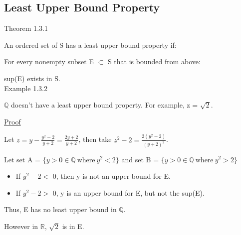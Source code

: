 \subsection{Least Upper Bound Property}

{ \color{red} Theorem 1.3.1 }

\qquad An ordered set of S has a least upper bound property if:

\qquad \qquad For every nonempty subset E $ \subset $ S that is bounded from above:

\qquad \qquad \qquad sup(E) exists in S. \\

{ \color{purple} Example 1.3.2 }

\qquad $ \mathbb{Q} $ doesn't have a least upper bound property. For example, z = $ \sqrt{2} $.

{\color{magenta} \underline{Proof}}

Let $ z = y - \frac{y^2-2}{y+2} = \frac{2y+2}{y+2} $, then take $ z^2-2 = \frac{2(y^2-2)}{(y+2)^2} $.

Let set A = $ \{ y > 0 \in \mathbb{Q} \ \text{where} \ y^2 < 2 \} $ and
set B = $ \{ y > 0 \in \mathbb{Q} \ \text{where} \ y^2 > 2 \} $

\begin{itemize}[leftmargin=2cm]
	\item If $ y^2-2 < $ 0, then y is not an upper bound for E.
	
	\item If $ y^2-2 > $ 0, y is an upper bound for E, but not the sup(E).
\end{itemize}

Thus, E has no least upper bound in $ \mathbb{Q} $.

However in $ \mathbb{R} $, $ \sqrt{2} $ is in E.
